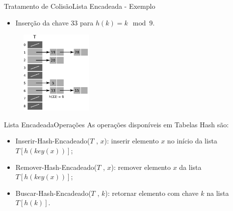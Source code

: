 \documentclass[aspectratio=169]{beamer}
\begin{document}
\begin{frame}{Tratamento de Colisão}{Lista Encadeada - Exemplo}
\begin{itemize}
 \item Inserção da chave 33 para $h(k) = k \mod 9$.
\end{itemize}
\begin{figure}[!h]
  \centering
  \includegraphics[width=100pt]{imagens/ex_encadeada7.png}
  \label{fig_ex_encadeada7}
\end{figure}
\end{frame}


\begin{frame}{Lista Encadeada}{Operações}
As operações disponíveis em Tabelas Hash são:
\begin{itemize}
 \item Inserir-Hash-Encadeado($T$ , $x$): inserir elemento $x$ no início da lista $T[ h ( key(x) )]$;
 \item Remover-Hash-Encadeado($T$ , $x$): remover elemento $x$ da lista $T[ h ( key(x) )]$;
 \item Buscar-Hash-Encadeado($T$ , $k$): retornar elemento com chave $k$ na lista $T[ h (k)]$.
\end{itemize}
\end{frame}
\end{document}
